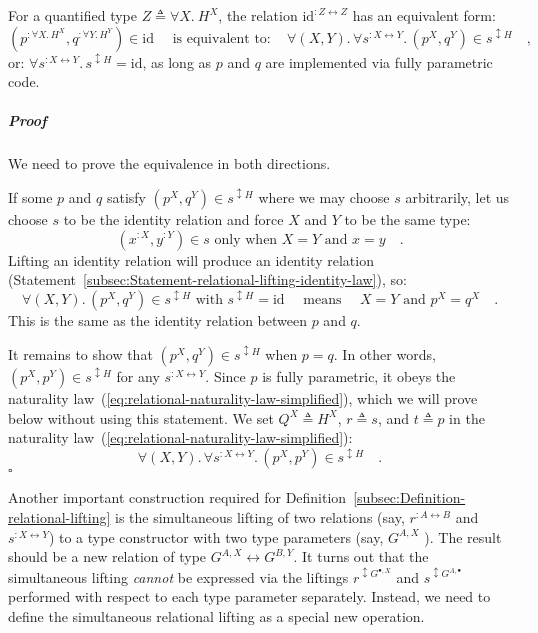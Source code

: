 For a quantified type $Z\triangleq\forall X.\ H^{X}$, the relation
$\text{id}^{:Z\leftrightarrow Z}$ has an equivalent form:
\[
(p^{:\forall X.\,H^{X}},q^{:\forall Y.\,H^{Y}})\in\text{id}\quad\text{ is equivalent to}:\quad\forall(X,Y).\,\forall s^{:X\leftrightarrow Y}.\,(p^{X},q^{Y})\in s^{\updownarrow H}\quad,
\]
or: $\forall s^{:X\leftrightarrow Y}.\,s^{\updownarrow H}=\text{id}$,
as long as $p$ and $q$ are implemented via fully parametric code.

\subparagraph{Proof}

We need to prove the equivalence in both directions.

If some $p$ and $q$ satisfy $(p^{X},q^{Y})\in s^{\updownarrow H}$
where we may choose $s$ arbitrarily, let us choose $s$ to be the
identity relation and force $X$ and $Y$ to be the same type:
\[
(x^{:X},y^{:Y})\in s\text{ only when }X=Y\text{ and }x=y\quad.
\]
Lifting an identity relation will produce an identity relation (Statement~\ref{subsec:Statement-relational-lifting-identity-law}),
so:
\[
\forall(X,Y).\,(p^{X},q^{Y})\in s^{\updownarrow H}\text{ with }s^{\updownarrow H}=\text{id}\quad\text{ means }\quad X=Y\text{ and }p^{X}=q^{X}\quad.
\]
This is the same as the identity relation between $p$ and $q$.

It remains to show that $(p^{X},q^{Y})\in s^{\updownarrow H}$ when
$p=q$. In other words, $(p^{X},p^{Y})\in s^{\updownarrow H}$ for
any $s^{:X\leftrightarrow Y}$. Since $p$ is fully parametric, it
obeys the naturality law~(\ref{eq:relational-naturality-law-simplified}),
which we will prove below without using this statement. We set $Q^{X}\triangleq H^{X}$,
$r\triangleq s$, and $t\triangleq p$ in the naturality law~(\ref{eq:relational-naturality-law-simplified}):
\[
\forall(X,Y).\,\forall s^{:X\leftrightarrow Y}.\,(p^{X},p^{Y})\in s^{\updownarrow H}\quad.
\]
$\square$

Another important construction required for Definition~\ref{subsec:Definition-relational-lifting}
is the simultaneous lifting of two relations (say, $r^{:A\leftrightarrow B}$
and $s^{:X\leftrightarrow Y}$) to a type constructor with two type
parameters (say, $G^{A,X}$ ). The result should be a new relation
of type $G^{A,X}\leftrightarrow G^{B,Y}$. It turns out that the simultaneous
lifting \emph{cannot} be expressed via the liftings $r^{\updownarrow G^{\bullet,X}}$
and $s^{\updownarrow G^{A,\bullet}}$ performed with respect to each
type parameter separately. Instead, we need to define the simultaneous
relational lifting as a special new operation. 

